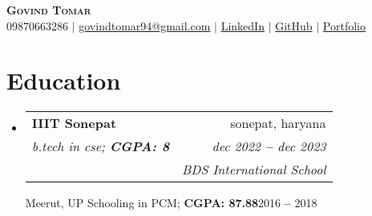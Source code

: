 \documentclass[letterpaper,11pt]{article}
\makeatletter
\newcommand{\resumeItem}[1]{
\item\small{
{#1 \vspace{-2pt}}
  }
}
\newcommand{\resumeSubheading}[4]{
  \vspace{-2pt}\item
    \begin{tabular*}{0.97\textwidth}[t]{l@{\extracolsep{\fill}}r}
      \textbf{#1} & #2 \\
      \textit{\small#3} & \textit{\small #4} \\
    \end{tabular*}\vspace{-7pt}
}
\newcommand{\resumeEducationHeading}[6]{
  \vspace{-2pt}\item
    \begin{tabular*}{0.97\textwidth}[t]{l@{\extracolsep{\fill}}r}
      \textbf{#1} & #2 \\
      \textit{\small#3} & \textit{\small #4} \\
      \textit{\small#5} & \textit{\small #6} \\
    \end{tabular*}\vspace{-5pt}
}
\newcommand{\resumeSubHeadingListStart}{\begin{itemize}[leftmargin=0.15in, label={}]}
\newcommand{\resumeSubHeadingListEnd}{\end{itemize}}
\newcommand{\resumeItemListStart}{\begin{itemize}}
\newcommand{\resumeItemListEnd}{\end{itemize}\vspace{-5pt}}
\makeatother
\begin{document}

\begin{center}
    \textbf{\Huge \scshape Govind Tomar} \\ \vspace{3pt}
    \small
    \faMobile \hspace{.5pt} {09870663286}
    $|$
    \faAt \hspace{.5pt} \href{mailto:govindtomar94@gmail.com}{govindtomar94@gmail.com}
    $|$
    \faLinkedinSquare \hspace{.5pt} \href{linkedin.com/govindtomar}{LinkedIn}
    $|$
    \faGithub \hspace{.5pt} \href{github.com/govindtomar}{GitHub}
    $|$
    \faGlobe \hspace{.5pt} \href{govindtomar.io}{Portfolio}
\end{center}




\section{Education}
  \vspace{3pt}
  \resumeSubHeadingListStart

  
\resumeEducationHeading
{IIIT Sonepat
}{sonepat, haryana}
{b.tech in cse;   \textbf{CGPA: 8}}{dec 2022 \textbf{--} dec 2023}

\resumeSubheading
{BDS International School
}{Meerut, UP}
{Schooling in PCM;   \textbf{CGPA: 87.88}}{2016 \textbf{--} 2018}


  \resumeSubHeadingListEnd




  

\end{document}
